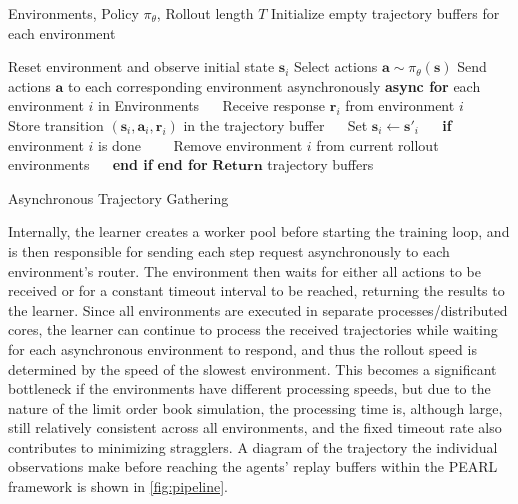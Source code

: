     \begin{algorithm}
        \begin{algorithmic}[1]
            \Require Environments, Policy $\pi_{\theta}$, Rollout length $T$
            \State Initialize empty trajectory buffers for each environment

                \State Reset environment and observe initial state $\mathbf{s}_i$
            \EndFor
                \State Select actions $\mathbf{a} \sim \pi_{\theta}(\mathbf{s})$
                \State Send actions $\mathbf{a}$ to each corresponding environment asynchronously
                \State \textbf{async for} {each environment $i$ in Environments}
                \State $\quad$ Receive response $\mathbf{r}_i$ from environment $i$
                \State $\quad$ Store transition $(\mathbf{s}_i, \mathbf{a}_i, \mathbf{r}_i)$ in the trajectory buffer
                \State $\quad$ Set $\mathbf{s}_i \leftarrow \mathbf{s'}_i$
                \State $\quad$ \textbf{if} environment $i$ is done
                \State $\quad$$\quad$Remove environment $i$ from current rollout environments
                \State $\quad$ \textbf{end if}
                \State \textbf{end for}
            \EndFor
            \State $\textbf{Return}$ trajectory buffers
        \end{algorithmic}
        \caption{Asynchronous Trajectory Gathering}
        \label{alg:trajectory}
    \end{algorithm}

    Internally, the learner creates a worker pool before starting the training loop, and is then responsible
    for sending each step request asynchronously to each environment's router.
    The environment then waits for either all actions to be received or for a constant timeout interval to be reached, returning the results to the learner.
    Since all environments are executed in separate processes/distributed cores, the learner can continue to process the
    received trajectories while waiting for each asynchronous environment to respond,
    and thus the rollout speed is determined by the speed of the slowest environment.
    This becomes a significant bottleneck if the environments have different processing speeds,
    but due to the nature of the limit order book simulation, the processing time is, although large,
    still relatively consistent across all environments, and the fixed timeout rate also contributes to minimizing stragglers.
    A diagram of the trajectory the individual observations make before reaching the agents' replay buffers within the PEARL framework
    is shown in \cref{fig:pipeline}.

